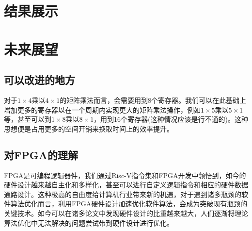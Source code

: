 \documentclass[a4paper, 14pt, oneside]{book} %
\numberwithin{equation}{subsection}
\begin{document}
	\section{结果展示}	
	
	
	\section{未来展望}
	\subsection{可以改进的地方}
	对于$1\times4$乘以$4\times1$的矩阵乘法而言，会需要用到8个寄存器。我们可以在此基础上增加更多的寄存器以在一个周期内实现更大的矩阵乘法操作，例如$1\times5$乘以$5\times1$等，甚至可以到$1\times8$乘以$8\times1$，用到16个寄存器(这种情况应该是行不通的)。这种思想便是占用更多的空间开销来换取时间上的效率提升。
	
	\subsection{对FPGA的理解}
	FPGA是可编程逻辑器件，我们通过Risc-V指令集和FPGA开发中领悟到，如今的硬件设计越来越自主化和多样化，甚至可以进行自定义逻辑指令和相应的硬件数据通路设计。这种极高的自由度给计算机行业带来新的机遇，对于遇到诸多瓶颈的软件算法优化而言，利用FPGA硬件设计加速优化软件算法，会成为突破现有瓶颈的关键技术。如今可以在诸多论文中发现硬件设计的比重越来越大，人们逐渐将理论算法优化中无法解决的问题尝试带到硬件设计进行优化。
	
	
\end{document}
